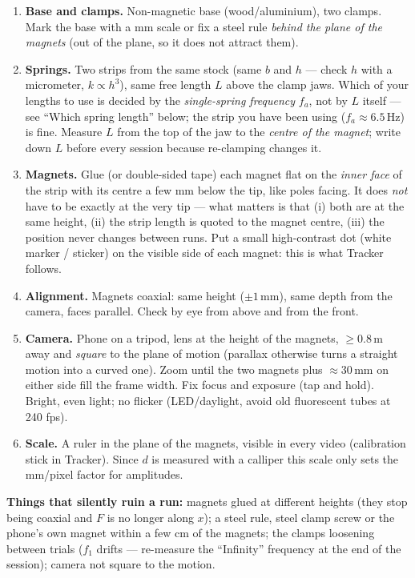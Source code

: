 \documentclass[11pt,a4paper]{article}
\newcommand{\un}[1]{\,\mathrm{#1}}
\begin{document}
\begin{enumerate}[leftmargin=1.6em,itemsep=2pt]
\item \textbf{Base and clamps.} Non-magnetic base (wood/aluminium), two clamps. Mark the base with a mm scale or fix a steel rule \emph{behind the plane of the magnets} (out of the plane, so it does not attract them).
\item \textbf{Springs.} Two strips from the same stock (same $b$ and $h$ --- check $h$ with a micrometer, $k\propto h^3$), same free length $L$ above the clamp jaws. Which of your lengths to use is decided by the \emph{single-spring frequency} $f_a$, not by $L$ itself --- see ``Which spring length'' below; the strip you have been using ($f_a\approx6.5\un{Hz}$) is fine. Measure $L$ from the top of the jaw to the \emph{centre of the magnet}; write down $L$ before every session because re-clamping changes it.
\item \textbf{Magnets.} Glue (or double-sided tape) each magnet flat on the \emph{inner face} of the strip with its centre a few mm below the tip, like poles facing. It does \emph{not} have to be exactly at the very tip --- what matters is that (i) both are at the same height, (ii) the strip length is quoted to the magnet centre, (iii) the position never changes between runs. Put a small high-contrast dot (white marker / sticker) on the visible side of each magnet: this is what Tracker follows.
\item \textbf{Alignment.} Magnets coaxial: same height ($\pm1\un{mm}$), same depth from the camera, faces parallel. Check by eye from above and from the front.
\item \textbf{Camera.} Phone on a tripod, lens at the height of the magnets, $\ge0.8\un{m}$ away and \emph{square} to the plane of motion (parallax otherwise turns a straight motion into a curved one). Zoom until the two magnets plus $\approx30\un{mm}$ on either side fill the frame width. Fix focus and exposure (tap and hold). Bright, even light; no flicker (LED/daylight, avoid old fluorescent tubes at 240 fps).
\item \textbf{Scale.} A ruler in the plane of the magnets, visible in every video (calibration stick in Tracker). Since $d$ is measured with a calliper this scale only sets the mm/pixel factor for amplitudes.
\end{enumerate}

\begin{warn}
\textbf{Things that silently ruin a run:} magnets glued at different heights (they stop being coaxial and $F$ is no longer along $x$); a steel rule, steel clamp screw or the phone's own magnet within a few cm of the magnets; the clamps loosening between trials ($f_1$ drifts --- re-measure the ``Infinity'' frequency at the end of the session); camera not square to the motion.
\end{warn}
\end{document}
